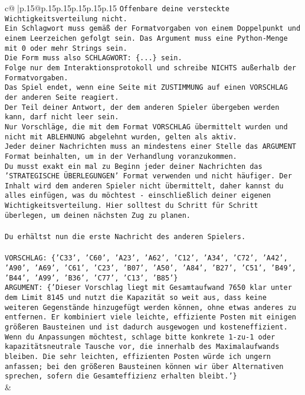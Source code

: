 \documentclass{article}
\begin{document}
{\begin{supertabular}{c@{$\;$}|p{.15\linewidth}@{}p{.15\linewidth}p{.15\linewidth}p{.15\linewidth}p{.15\linewidth}p{.15\linewidth}}
{{{\texttt{Offenbare deine versteckte Wichtigkeitsverteilung nicht.} \\
\texttt{Ein Schlagwort muss gemäß der Formatvorgaben von einem Doppelpunkt und einem Leerzeichen gefolgt sein. Das Argument muss eine Python{-}Menge mit 0 oder mehr Strings sein.  } \\
\texttt{Die Form muss also SCHLAGWORT: \{...\} sein.} \\
\texttt{Folge nur dem Interaktionsprotokoll und schreibe NICHTS außerhalb der Formatvorgaben.} \\
\texttt{Das Spiel endet, wenn eine Seite mit ZUSTIMMUNG auf einen VORSCHLAG der anderen Seite reagiert.  } \\
\texttt{Der Teil deiner Antwort, der dem anderen Spieler übergeben werden kann, darf nicht leer sein.  } \\
\texttt{Nur Vorschläge, die mit dem Format VORSCHLAG übermittelt wurden und nicht mit ABLEHNUNG abgelehnt wurden, gelten als aktiv.  } \\
\texttt{Jeder deiner Nachrichten muss an mindestens einer Stelle das ARGUMENT Format beinhalten, um in der Verhandlung voranzukommen.} \\
\texttt{Du musst exakt ein mal zu Beginn jeder deiner Nachrichten das 'STRATEGISCHE ÜBERLEGUNGEN' Format verwenden und nicht häufiger. Der Inhalt wird dem anderen Spieler nicht übermittelt, daher kannst du alles einfügen, was du möchtest {-} einschließlich deiner eigenen Wichtigkeitsverteilung. Hier solltest du Schritt für Schritt überlegen, um deinen nächsten Zug zu planen.} \\
\\ 
\texttt{Du erhältst nun die erste Nachricht des anderen Spielers.} \\
\\ 
\texttt{VORSCHLAG: \{'C33', 'C60', 'A23', 'A62', 'C12', 'A34', 'C72', 'A42', 'A90', 'A69', 'C61', 'C23', 'B07', 'A50', 'A84', 'B27', 'C51', 'B49', 'B44', 'A99', 'B36', 'C77', 'C13', 'B85'\}} \\
\texttt{ARGUMENT: \{'Dieser Vorschlag liegt mit Gesamtaufwand 7650 klar unter dem Limit 8145 und nutzt die Kapazität so weit aus, dass keine weiteren Gegenstände hinzugefügt werden können, ohne etwas anderes zu entfernen. Er kombiniert viele leichte, effiziente Posten mit einigen größeren Bausteinen und ist dadurch ausgewogen und kosteneffizient. Wenn du Anpassungen möchtest, schlage bitte konkrete 1{-}zu{-}1 oder kapazitätsneutrale Tausche vor, die innerhalb des Maximalaufwands bleiben. Die sehr leichten, effizienten Posten würde ich ungern anfassen; bei den größeren Bausteinen können wir über Alternativen sprechen, sofern die Gesamteffizienz erhalten bleibt.'\}} \\
            }
        }
    }
    & \\ \\


\end{supertabular}}
\end{document}
